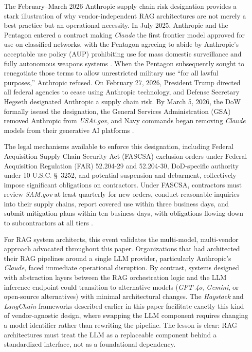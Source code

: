 \documentclass[12pt,letterpaper]{article}
\let\cite\parencite
\begin{document}
The February--March 2026 Anthropic supply chain risk designation provides a stark illustration of why vendor-independent RAG architectures are not merely a best practice but an operational necessity. In July 2025, Anthropic and the Pentagon entered a contract making \textit{Claude} the first frontier model approved for use on classified networks, with the Pentagon agreeing to abide by Anthropic's acceptable use policy (AUP) prohibiting use for mass domestic surveillance and fully autonomous weapons systems \cite{mayerbrown2026}. When the Pentagon subsequently sought to renegotiate those terms to allow unrestricted military use ``for all lawful purposes,'' Anthropic refused. On February 27, 2026, President Trump directed all federal agencies to cease using Anthropic technology, and Defense Secretary Hegseth designated Anthropic a supply chain risk. By March 5, 2026, the DoW formally issued the designation, the General Services Administration (GSA) removed Anthropic from \textit{USAi.gov}, and Navy commands began removing \textit{Claude} models from their generative AI platforms \cite{mayerbrown2026}.

The legal mechanisms available to enforce this designation, including Federal Acquisition Supply Chain Security Act (FASCSA) exclusion orders under Federal Acquisition Regulation (FAR) 52.204-29 and 52.204-30, DoD-specific authority under 10 U.S.C. \S~3252, and potential suspension and debarment, collectively impose significant obligations on contractors. Under FASCSA, contractors must review \textit{SAM.gov} at least quarterly for new orders, conduct reasonable inquiries into their supply chains, report covered use within three business days, and submit mitigation plans within ten business days, with obligations flowing down to subcontractors at all tiers \cite{mayerbrown2026}.

For RAG system architects, this event validates the multi-model, multi-vendor approach advocated throughout this paper. Organizations that had architected their RAG pipelines around a single LLM provider, particularly Anthropic's \textit{Claude}, faced immediate operational disruption. By contrast, systems designed with abstraction layers between the RAG orchestration logic and the LLM inference endpoint could transition to alternative models (\textit{GPT-4o}, \textit{Gemini}, or open-source alternatives) with minimal architectural changes. The \textit{Haystack} and \textit{LangChain} frameworks described earlier in this paper facilitate exactly this kind of vendor-agnostic design, where swapping the LLM component requires changing a model identifier rather than rewriting the pipeline. The lesson is clear: RAG architectures must treat the LLM as a replaceable component behind a standardized interface, not as a foundational dependency.
\end{document}
